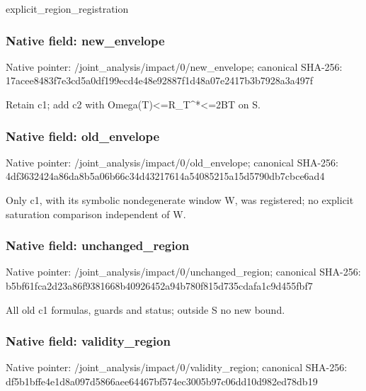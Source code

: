 \documentclass[10pt,a4paper]{article}
\begin{document}
\begingroup\raggedright\sloppy explicit\_\allowbreak{}region\_\allowbreak{}registration\par\endgroup

\subsubsection{Native field: new\_\allowbreak{}envelope}
Native pointer: /joint\_\allowbreak{}analysis/impact/0/new\_\allowbreak{}envelope; canonical SHA-256: 17acee8483f7e3cd5a0df199ecd4e48e92887f1d48a07e2417b3b7928a3a497f

\begingroup\raggedright\sloppy Retain c1;\allowbreak{} add c2 with Omega(T)<=\allowbreak{}R\_\allowbreak{}T\textasciicircum{}*<=\allowbreak{}2BT on S.\par\endgroup

\subsubsection{Native field: old\_\allowbreak{}envelope}
Native pointer: /joint\_\allowbreak{}analysis/impact/0/old\_\allowbreak{}envelope; canonical SHA-256: 4df3632424a86da8b5a06b66c34d43217614a54085215a15d5790db7cbce6ad4

\begingroup\raggedright\sloppy Only c1,\allowbreak{} with its symbolic nondegenerate window W,\allowbreak{} was registered;\allowbreak{} no explicit saturation comparison independent of W.\par\endgroup

\subsubsection{Native field: unchanged\_\allowbreak{}region}
Native pointer: /joint\_\allowbreak{}analysis/impact/0/unchanged\_\allowbreak{}region; canonical SHA-256: b5bf61fca2d23a86f9381668b40926452a94b780f815d735cdafa1c9d455fbf7

\begingroup\raggedright\sloppy All old c1 formulas,\allowbreak{} guards and status;\allowbreak{} outside S no new bound.\par\endgroup

\subsubsection{Native field: validity\_\allowbreak{}region}
Native pointer: /joint\_\allowbreak{}analysis/impact/0/validity\_\allowbreak{}region; canonical SHA-256: df5b1bffe4e1d8a097d5866aee64467bf574ec3005b97c06dd10d982ed78db19
\end{document}
